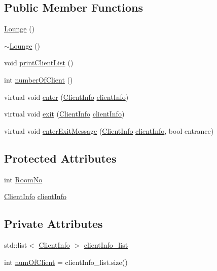 \subsection*{Public Member Functions}
\begin{DoxyCompactItemize}
\item 
\hyperlink{class_lounge_a5893f85ae0524bfce30da7804e35f66a}{Lounge} ()
\item 
\hyperlink{class_lounge_a8ed1931db1abeb8defaf19bf941a9f3d}{$\sim$\+Lounge} ()
\item 
void \hyperlink{class_lounge_a7b7209c805b8fd7f3a77fd43da386f2e}{print\+Client\+List} ()
\item 
int \hyperlink{class_lounge_a905f4be93966a831da9e7cf68f03fb02}{number\+Of\+Client} ()
\item 
virtual void \hyperlink{class_room_af6369792216d4f6d8dc14c27fbe8218b}{enter} (\hyperlink{class_client_info}{Client\+Info} \hyperlink{class_room_a4dd1160fe55a497f7349488d934b1805}{client\+Info})
\item 
virtual void \hyperlink{class_room_a85bb6bc37f4caff36854e38cf659df62}{exit} (\hyperlink{class_client_info}{Client\+Info} \hyperlink{class_room_a4dd1160fe55a497f7349488d934b1805}{client\+Info})
\item 
virtual void \hyperlink{class_room_a463a61c145c7609cfc3433cb201ad71f}{enter\+Exit\+Message} (\hyperlink{class_client_info}{Client\+Info} \hyperlink{class_room_a4dd1160fe55a497f7349488d934b1805}{client\+Info}, bool entrance)
\end{DoxyCompactItemize}
\subsection*{Protected Attributes}
\begin{DoxyCompactItemize}
\item 
int \hyperlink{class_room_a7b2baed8e22a938246e54984cf396b47}{Room\+No}
\item 
\hyperlink{class_client_info}{Client\+Info} \hyperlink{class_room_a4dd1160fe55a497f7349488d934b1805}{client\+Info}
\end{DoxyCompactItemize}
\subsection*{Private Attributes}
\begin{DoxyCompactItemize}
\item 
std\+::list$<$ \hyperlink{class_client_info}{Client\+Info} $>$ \hyperlink{class_lounge_aa78440709149245f5ed57d39008ba278}{client\+Info\+\_\+list}
\item 
int \hyperlink{class_lounge_a3da2b80f26e521b988cbe7e1bfa0548b}{num\+Of\+Client} = client\+Info\+\_\+list.\+size()
\end{DoxyCompactItemize}


